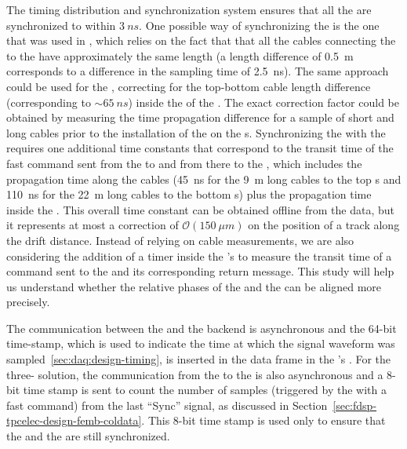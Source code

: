 The timing distribution and synchronization system ensures that
all the  are synchronized to within $\SI{3}{ns}$. 
One possible way of synchronizing the  is the one
that was used in , which relies on the fact that 
that all the cables connecting the  to the
 have approximately the same length (a length 
difference of \SI{0.5}{m} corresponds to a difference in the
sampling time of \SI{2.5}{ns}). The same approach could be used
for the  , correcting for the top-bottom 
 cable length difference (corresponding to $\sim\SI{65}{ns}$) 
inside the  of the . The exact correction
factor could be obtained by measuring the time propagation 
difference for a sample of short and long cables prior to the 
installation of the  on the s. 
Synchronizing the  with the  requires one
additional time constants that correspond to the transit 
time of the fast command sent from the  to
 and from there to the ,
which includes the propagation time along the cables
(\SI{45}{ns} for the \SI{9}{m} long cables to the top s
and \SI{110}{ns} for the \SI{22}{m} long cables to the bottom s) 
plus the propagation time inside the . This overall 
time constant can be obtained offline from the data, but it represents 
at most a correction of $\mathcal{O}(\SI{150}{\mu m})$ on the 
position of a track along the drift distance.
Instead of relying on cable measurements, we are also considering
the addition of a timer inside the 's 
to measure the transit time of a command
sent to the  and its corresponding return
message. This study will help us understand whether the 
relative phases of the  and the  
can be aligned more precisely.

The communication between the  and the  
backend is asynchronous and the \num{64}-bit time-stamp, which
is used to indicate the time at which the signal waveform was
sampled~\ref{sec:daq:design-timing}, is inserted in the data frame
in the 's . 
For the three- solution, the communication
from the  to the  is also
asynchronous and a \num{8}-bit time stamp is sent to
count the number of  samples (triggered by
the  with a fast command) from the last
``Sync'' signal, as discussed in Section~\ref{sec:fdsp-tpcelec-design-femb-coldata}.
This \num{8}-bit time stamp is used only to ensure
that the  and the  are
still synchronized. 

